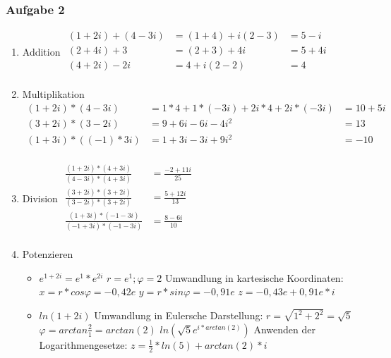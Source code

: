 \subsubsection{Aufgabe 2}
	
	\begin{enumerate}	
		
	\item Addition\newline
		$\begin{array}{lll} 
		(1 + 2i)+(4-3i) & =(1 + 4)+i(2-3) & =5-i\\
		(2 + 4i)+3 & =(2 + 3)+4i & =5+4i\\
		(4 + 2i)-2i & =4+i(2-2) & =4\\		
		\end{array}$
	\item Multiplikation\newline
		$\begin{array}{lll} 
		(1 + 2i)*(4-3i) & =1*4 + 1*(-3i) + 2i*4 +2i * (-3i) & =10+5i\\
		(3 + 2i)*(3-2i) & =9+6i-6i-4i^{2} & =13\\
		(1 + 3i)*((-1)*3i) & =1+3i-3i+9i^{2} & =-10\\		
		\end{array}$				
	\item Division\newline
		$\begin{array}{lll} 
		\frac{(1+2i)*(4+3i)}{(4-3i)*(4+3i)} & =\frac{-2+11i}{25}\\
		\frac{(3+2i)*(3+2i)}{(3-2i)*(3+2i)} & =\frac{5+12i}{13} \\
		\frac{(1+3i)*(-1-3i)}{(-1+3i)*(-1-3i)} & =\frac{8-6i}{10}\\		
		\end{array}$
	\item Potenzieren\newline
		\begin{itemize}
			\item $e^{1+2i}=e^{1}*e^{2i}$\newline
			$r = e^1 ; \varphi=2$\newline
			Umwandlung in kartesische Koordinaten:\newline
			$x=r*cos\varphi = -0,42e$\newline
			$y=r*sin\varphi = -0,91e$\newline
			$z=-0,43e + 0,91e * i$

			\item $ln(1+2i)$\newline
			Umwandlung in Eulersche Darstellung:\newline
			$r = \sqrt{1^2 + 2^2} = \sqrt{5}$\newline
			$ \varphi=arctan\frac{2}{1}=arctan(2)$\newline
			$ln(\sqrt{5}e^{i*arctan(2)})$\newline
			Anwenden der Logarithmengesetze:\newline
			$z=\frac{1}{2} * ln(5) + arctan(2) * i$
		\end{itemize}
	\end{enumerate}
	
